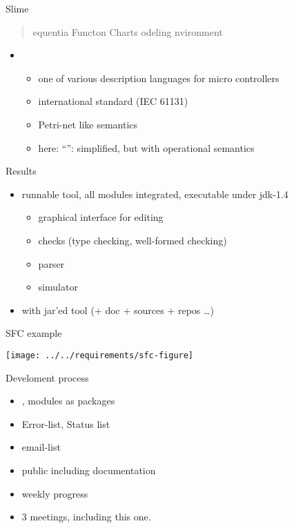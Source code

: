 


\begin{myslide}{Slime}
  \begin{quote}
    equentia Functon Charts
    odeling nvironment
  \end{quote}
  \begin{itemize}
  \item {}
    \begin{itemize}
    \item one of various  description languages for micro
      controllers
    \item international standard (IEC 61131)
    \item  Petri-net like semantics
    \item here: ``'': simplified, but with
       operational semantics
    \end{itemize}
  \end{itemize}
\end{myslide}

\begin{myslide}{Results}
  \begin{itemize}
  \item runnable tool, all modules integrated, executable under jdk-1.4
    \begin{itemize}
    \item graphical interface for editing
    \item checks (type checking, well-formed checking)
    \item parser
    \item simulator
    \end{itemize}
  \item {} with jar'ed tool (+ doc + sources + repos
    \ldots)
  \end{itemize}
\end{myslide}


\begin{myslide}{SFC example}
  

\vspace{-1cm}

  \texttt{[image: ../../requirements/sfc-figure]}

\end{myslide}




\begin{myslide}{Develoment process}
  \begin{itemize}
  \item {}, modules as packages
  \item Error-list, Status list
  \item email-list
  \item public  including \javadoc{} documentation
  \item weekly progress 
  \item 3  meetings, including this one.
  \end{itemize}
\end{myslide}


